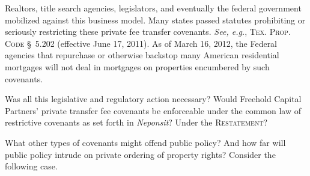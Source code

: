 Realtors, title search agencies, legislators, and eventually the federal
government mobilized against this business model. Many states passed statutes
prohibiting or seriously restricting these private fee transfer covenants.
\textit{See, e.g.}, \textsc{Tex. Prop. Code} \S~5.202 (effective June 17, 2011).
As of March 16, 2012, the Federal agencies that repurchase or otherwise backstop
many American residential mortgages will not deal in mortgages on properties
encumbered by such covenants.

Was all this legislative and regulatory action necessary? Would Freehold Capital
Partners' private transfer fee covenants be enforceable under the common law of
restrictive covenants as set forth in \textit{Neponsit}? Under the
\textsc{Restatement}?


\item What other types of covenants might offend public policy? And how far will
public policy intrude on private ordering of property rights? Consider the
following case.

